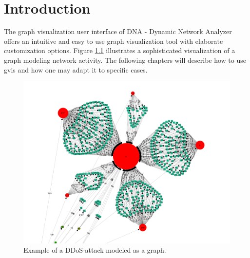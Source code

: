 \chapter{Introduction}
The graph visualization user interface of DNA - Dynamic Network Analyzer offers an intuitive and easy to use graph visualization tool with elaborate customization options. Figure \ref{ex:attack} illustrates a sophisticated visualization of a graph modeling network activity. The following chapters will describe how to use gvis and how one may adapt it to specific cases.

\begin{figure} [h]
\centering
\includegraphics [scale=0.6] {images/attack-example}
\caption{Example of a DDoS-attack modeled as a graph.}
\label{ex:attack}
\end{figure}